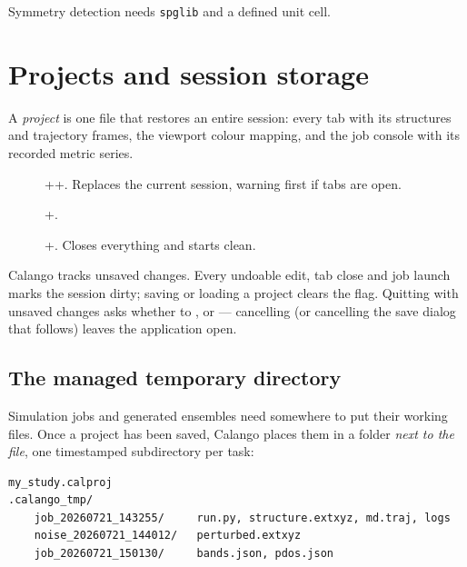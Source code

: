 \begin{calwarn}
Symmetry detection needs \texttt{spglib} and a defined unit cell.
\end{calwarn}

\section{Projects and session storage}
\label{sec:projects}

A \emph{project} is one  file that restores an entire
session: every tab with its structures and trajectory frames, the viewport
colour mapping, and the job console with its recorded metric series.

\begin{description}
  \item[\menusep{}\menusep{}]
    ++. Replaces the current session, warning
    first if tabs are open.
  \item[\menusep{}\menusep{}]
    +.
  \item[\menusep{}] +. Closes
    everything and starts clean.
\end{description}

Calango tracks unsaved changes. Every undoable edit, tab close and job
launch marks the session dirty; saving or loading a project clears the
flag. Quitting with unsaved changes asks whether to ,
 or  --- cancelling (or cancelling the save dialog
that follows) leaves the application open.

\subsection{The managed temporary directory}
\label{sec:calango-tmp}

Simulation jobs and generated ensembles need somewhere to put their working
files. Once a project has been saved, Calango places them in a
 folder \emph{next to the  file}, one
timestamped subdirectory per task:

\begin{lstlisting}
my_study.calproj
.calango_tmp/
    job_20260721_143255/     run.py, structure.extxyz, md.traj, logs
    noise_20260721_144012/   perturbed.extxyz
    job_20260721_150130/     bands.json, pdos.json
\end{lstlisting}

